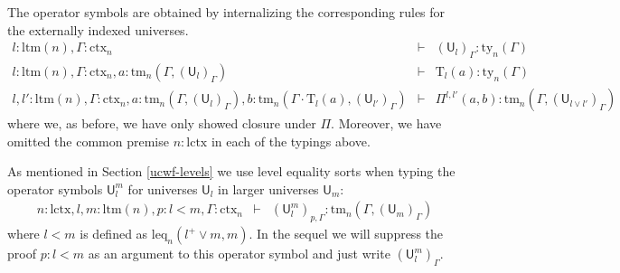 \documentclass[submission,copyright,creativecommons]{eptcs}
\newcommand{\UU}{\mathsf{U}}
\def\UU{\mathsf{U}}
\newcommand{\N}{\mathsf{N}}
\def\Pihat{\Pi}
\def\lctx{\mathrm{lctx}}
\def\ltm{\mathrm{ltm}}
\def\leq{\mathrm{leq}}
\newcommand{\ctx}{\mathrm{ctx}}
\newcommand{\ty}{\mathrm{ty}}
\newcommand{\tm}{\mathrm{tm}}
\def\U{\mathsf{U}}
\newcommand{\Ta}{\mathrm{T}}
\begin{document}
The operator symbols are obtained by internalizing the corresponding rules for the externally indexed universes.
\begin{eqnarray*}
l : \ltm(n), \Gamma : \ctx_n &\vdash& (\U_{l})_\Gamma : \ty_n(\Gamma)\\
l : \ltm(n), \Gamma : \ctx_n, a : \tm_n(\Gamma,(\U_{l})_\Gamma) &\vdash& {\Ta_{l}}(a) : \ty_n(\Gamma)\\
 l, l' : \ltm(n), \Gamma : \ctx_n,
a : \tm_n(\Gamma,(\U_{l})_\Gamma),
b :  \tm_n(\Gamma \cdot \Ta_{l}(a), (\U_{l'})_\Gamma)
&\vdash&
 \Pihat^{l,l'}(a,b) : \tm_n(\Gamma,(\U_{l \vee l'})_\Gamma)
\end{eqnarray*}
where we, as before, we have only showed closure under $\Pi$. Moreover, we have omitted the common premise $n : \lctx$ in each of the typings above.

As mentioned in Section \ref{ucwf-levels} we use level equality sorts when typing the operator symbols $\UU^m_l$ for universes $\UU_l$ in larger universes $\UU_m$:
\begin{eqnarray*}
n : \lctx, l, m : \ltm(n), p : l < m, \Gamma : \ctx_n&\vdash&(\UU^m_l)_{p,\Gamma} : \tm_n(\Gamma,(\UU_{m})_\Gamma)
\end{eqnarray*}
where $l < m$ is defined as $\leq_n(l^+ \vee m, m)$. In the sequel we will suppress the proof $p : l < m$ as an argument to this operator symbol and just write $(\UU^m_l)_{\Gamma}$.
\end{document}
